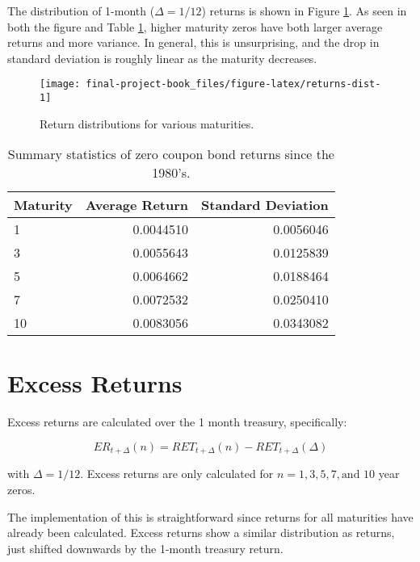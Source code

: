 \documentclass[openany]{book}
\theoremstyle{definition}
\theoremstyle{definition}
\theoremstyle{definition}
\theoremstyle{remark}
\begin{document}
The distribution of 1-month (\(\Delta = 1/12\)) returns is shown in
Figure \ref{fig:returns-dist}. As seen in both the figure and Table
\ref{tab:returns-summary}, higher maturity zeros have both larger
average returns and more variance. In general, this is unsurprising, and
the drop in standard deviation is roughly linear as the maturity
decreases.

\small

\begin{figure}[H]

{\centering \texttt{[image: final-project-book\_files/figure-latex/returns-dist-1]} 

}

\caption{Return distributions for various maturities.}\label{fig:returns-dist}
\end{figure}

\normalsize

\small

\begin{table}[H]

\caption{\label{tab:returns-summary}Summary statistics of zero coupon bond returns since the 1980's.}
\centering
\begin{tabular}[t]{lrr}
\toprule
Maturity & Average Return & Standard Deviation\\
\midrule
1 & 0.0044510 & 0.0056046\\
3 & 0.0055643 & 0.0125839\\
5 & 0.0064662 & 0.0188464\\
7 & 0.0072532 & 0.0250410\\
10 & 0.0083056 & 0.0343082\\
\bottomrule
\end{tabular}
\end{table}

\normalsize

\hypertarget{excess-returns}{%
\section{Excess Returns}\label{excess-returns}}

Excess returns are calculated over the 1 month treasury, specifically:

\[ ER_{t+\Delta}(n) = RET_{t+\Delta}(n) - RET_{t+\Delta}(\Delta) \]

with \(\Delta = 1 / 12\). Excess returns are only calculated for
\(n = 1, 3, 5, 7, \text{and } 10\) year zeros.

The implementation of this is straightforward since returns for all
maturities have already been calculated. Excess returns show a similar
distribution as returns, just shifted downwards by the 1-month treasury
return.
\end{document}
